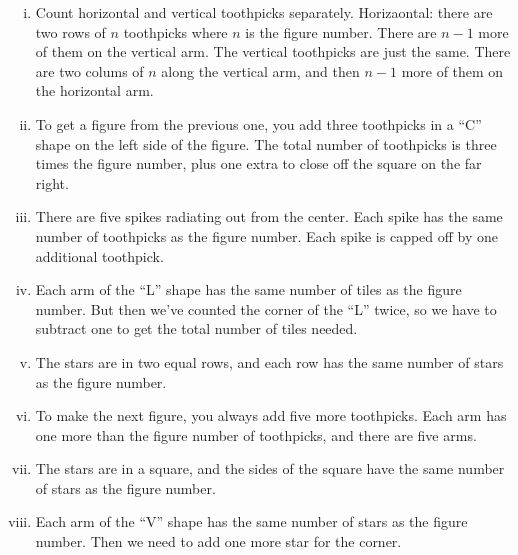 \begin{enumerate}[(i)]

\item
Count horizontal and vertical toothpicks separately.  Horizaontal: there are two rows of $n$ toothpicks where $n$ is the figure number.  There are $n-1$ more of them on the vertical arm.  The vertical toothpicks are just the same.  There are two colums of $n$ along the  vertical arm, and then $n-1$ more of them on the horizontal arm.\\



\item
 To get a figure from the previous one, you add three toothpicks in a ``C'' shape on the left side of the figure.  The total number of toothpicks is three times the figure number, plus one extra to close off the square on the far right.\\


\item
 There are five spikes radiating out from the center.  Each spike has the same number of toothpicks as the figure number.  Each spike is capped off by one additional toothpick.\\
 
 \item
Each arm of the ``L'' shape has the same number of tiles as the figure number.  But then we've counted the corner of the ``L'' twice, so we have to subtract one to get the total number of tiles needed.\\

\item
The stars are in two equal rows, and each row has the same number of stars as the figure number.\\

\item
To make the next figure, you always add five more toothpicks.  Each arm has one more than the figure number of toothpicks, and there are five arms.\\



\item
The stars are in a square, and the sides of the square have the same number of stars as the figure number.\\

\item
Each arm of the ``V'' shape has the same number of stars as the figure number.  Then we need to add one more star for the corner.\\



\end{enumerate}
